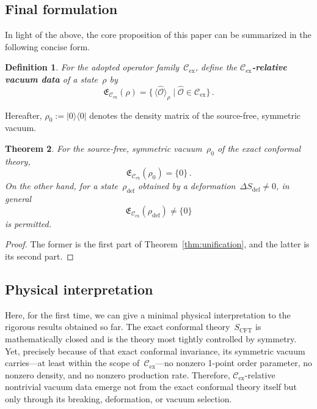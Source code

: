 \documentclass[
  aps,
  prd,
  preprint,
  groupedaddress,
  nofootinbib,
  longbibliography
]{revtex4-2}
\newtheorem{definition}{Definition}[section]
\newtheorem{theorem}[definition]{Theorem}
\theoremstyle{remark}
\newcommand{\Cex}{\mathcal{C}_{\mathrm{ex}}}
\begin{document}
\subsection{Final formulation}\label{subsec:5-6}

In light of the above, the core proposition of this paper can
be summarized in the following concise form.

\begin{definition}\label{def:vacuum-data-set}
For the adopted operator family~$\Cex$, define the
\textbf{$\Cex$-relative vacuum data} of a state~$\rho$ by
\begin{equation}\label{eq:E-Cex}
  \mathfrak{E}_{\Cex}(\rho)
  = \bigl\{\,
      \langle\hat{\mathcal{O}}\rangle_\rho
      \;\big|\;
      \hat{\mathcal{O}}\in\Cex
    \bigr\}\,.
\end{equation}
\end{definition}

\noindent
Hereafter, $\rho_0 := |0\rangle\langle 0|$ denotes the density
matrix of the source-free, symmetric vacuum.

\begin{theorem}\label{thm:final}
For the source-free, symmetric vacuum~$\rho_0$ of the exact
conformal theory,
\begin{equation}\label{eq:E-zero}
  \mathfrak{E}_{\Cex}(\rho_0) = \{0\}\,.
\end{equation}
On the other hand, for a state~$\rho_{\mathrm{def}}$ obtained
by a deformation~$\Delta S_{\mathrm{def}}\neq 0$, in general
\begin{equation}\label{eq:E-nonzero}
  \mathfrak{E}_{\Cex}(\rho_{\mathrm{def}}) \neq \{0\}
\end{equation}
is permitted.
\end{theorem}

\begin{proof}
The former is the first part of
Theorem~\ref{thm:unification}, and the latter is its second part.
\end{proof}

\subsection{Physical interpretation}\label{subsec:5-7}

Here, for the first time, we can give a minimal physical
interpretation to the rigorous results obtained so far.
The exact conformal theory~$S_{\mathrm{CFT}}$ is mathematically
closed and is the theory most tightly controlled by symmetry.
Yet, precisely because of that exact conformal invariance, its
symmetric vacuum carries---at least within the scope
of~$\Cex$---no nonzero 1-point order parameter, no nonzero
density, and no nonzero production rate.
Therefore, $\Cex$-relative nontrivial vacuum data emerge not from
the exact conformal theory itself but only through
its breaking, deformation, or vacuum selection.
\end{document}
